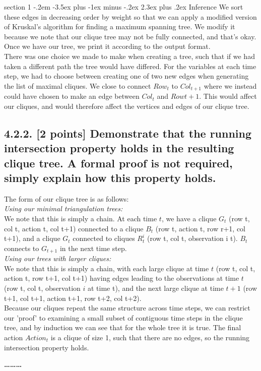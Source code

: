 \documentclass[12pt]{article}
\makeatletter
\newenvironment{problem}{\@startsection
       {section}
       {1}
       {-.2em}
       {-3.5ex plus -1ex minus -.2ex}
       {2.3ex plus .2ex}
       {\pagebreak[3]%
       \large\bf\noindent{Problem }
       }
       }
       {%
       \begin{center}\large\bf \ldots\ldots\ldots\end{center}}
\makeatother
\begin{document}
\begin{problem}{Inference}
We sort these edges in decreasing order by weight so that we can apply
a modified version of Kruskal's algorithm for finding a maximum spanning
tree.  We modify it because we note that our clique tree may not be 
fully connected, and that's okay.\\

Once we have our tree, we print it according to the output format.\\

There was one choice we made to make when creating a tree, such that if
we had taken a different path the tree would have differed.  For the 
variables at each time step, we had to choose between creating one of 
two new edges when generating the list of maximal cliques.  We close to
connect $Row_t$ to $Col_{t+1}$ where we instead could have chosen to make 
an edge between $Col_t$ and $Row{t+1}$.  This would affect our cliques, and
would therefore affect the vertices and edges of our clique tree.\\

\subsection*{4.2.2. [2 points] Demonstrate that the running intersection property holds 
in the resulting clique tree. A formal proof is not required, simply 
explain how this property holds.}

\noindent The form of our clique tree is as follows:\\
\noindent \textit{Using our minimal triangulation trees:}\\
We note that this is simply a chain.  At each time $t$, we have a clique $G_t$ (row t, col t, action t, col t+1) connected to a clique $B_t$ (row t, action t, row r+1, col t+1), and a clique $G_t$ connected to cliques $R_{t}^{i}$ (row t, col t, observation i t).  $B_t$ connects to $G_{t+1}$ in the next time step.\\
\noindent \textit{Using our trees with larger cliques:}\\
We note that this is simply a chain, with each large clique at time $t$ (row t, col t, action t, row t+1, col t+1) having edges leading to the observations at time $t$ (row t, col t, observation $i$ at time t), and the next large clique at time $t+1$ (row t+1, col t+1, action t+1, row t+2, col t+2).\\

\noindent Because our cliques repeat the same structure across time steps, 
we can restrict our 'proof' to examining a small subset of contiguous
time steps in the clique tree, and by induction we can see that for the
whole tree it is true.  The final action $Action_t$ is a clique of size 1,
such that there are no edges, so the running intersection property holds. \\


\end{problem}
\end{document}
